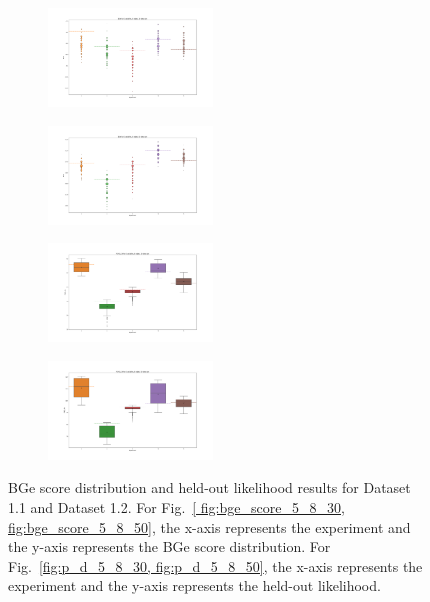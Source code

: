 \documentclass{lxaiproposal}
\begin{document}
    \begin{figure}[h]
        \centering
        \begin{subfigure}
            \centering
            \includegraphics[width=0.48\textwidth]{figures/BGe_5_8_30}
            \label{fig:bge_score_5_8_30}
        \end{subfigure}
        \begin{subfigure}
            \centering
            \includegraphics[width=0.48\textwidth]{figures/BGe_5_8_50}
            \label{fig:bge_score_5_8_50}
        \end{subfigure}
        \hfill
        \begin{subfigure}
            \centering
            \includegraphics[width=0.48\textwidth]{figures/P_d_prime_5_8_30}
            \label{fig:p_d_5_8_30}
        \end{subfigure}
        \begin{subfigure}
            \centering
            \includegraphics[width=0.48\textwidth]{figures/P_d_prime_5_8_50}
            \label{fig:p_d_5_8_50}
        \end{subfigure}
        \caption{BGe score distribution and held-out likelihood results for Dataset 1.1 and Dataset 1.2. For Fig.~\ref{
            fig:bge_score_5_8_30, fig:bge_score_5_8_50}, the x-axis represents the experiment and the y-axis
        represents the BGe score distribution. For Fig.~\ref{fig:p_d_5_8_30, fig:p_d_5_8_50}, the x-axis
        represents the experiment and the y-axis represents the held-out likelihood.}
        \label{fig:illustration_5_8}
    \end{figure}
\end{document}
